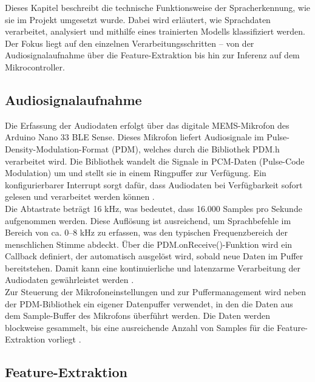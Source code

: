 Dieses Kapitel beschreibt die technische Funktionsweise der Spracherkennung, wie sie im Projekt umgesetzt wurde. Dabei wird erläutert, wie Sprachdaten verarbeitet, analysiert und mithilfe eines trainierten Modells klassifiziert werden. Der Fokus liegt auf den einzelnen Verarbeitungsschritten – von der Audiosignalaufnahme über die Feature-Extraktion bis hin zur Inferenz auf dem Mikrocontroller.

\subsection{Audiosignalaufnahme}

Die Erfassung der Audiodaten erfolgt über das digitale MEMS-Mikrofon des Arduino Nano 33 BLE Sense. Dieses Mikrofon liefert Audiosignale im Pulse-Density-Modulation-Format (PDM), welches durch die Bibliothek PDM.h verarbeitet wird. Die Bibliothek wandelt die Signale in PCM-Daten (Pulse-Code Modulation) um und stellt sie in einem Ringpuffer zur Verfügung. Ein konfigurierbarer Interrupt sorgt dafür, dass Audiodaten bei Verfügbarkeit sofort gelesen und verarbeitet werden können \cite{Arduino:2024PDM}\cite{Arduino:2025NanoBLE}.\\
\bigskip
Die Abtastrate beträgt 16 kHz, was bedeutet, dass 16.000 Samples pro Sekunde aufgenommen werden. Diese Auflösung ist ausreichend, um Sprachbefehle im Bereich von ca. 0–8 kHz zu erfassen, was den typischen Frequenzbereich der menschlichen Stimme abdeckt. Über die PDM.onReceive()-Funktion wird ein Callback definiert, der automatisch ausgelöst wird, sobald neue Daten im Puffer bereitstehen. Damit kann eine kontinuierliche und latenzarme Verarbeitung der Audiodaten gewährleistet werden \cite{Arduino:2024PDM}.\\
\bigskip
Zur Steuerung der Mikrofoneinstellungen und zur Puffermanagement wird neben der PDM-Bibliothek ein eigener Datenpuffer verwendet, in den die Daten aus dem Sample-Buffer des Mikrofons überführt werden. Die Daten werden blockweise gesammelt, bis eine ausreichende Anzahl von Samples für die Feature-Extraktion vorliegt \cite{Arduino:2025NanoBLE}.\\

\subsection{Feature-Extraktion} \label{sec:Feature-Extraktion}

